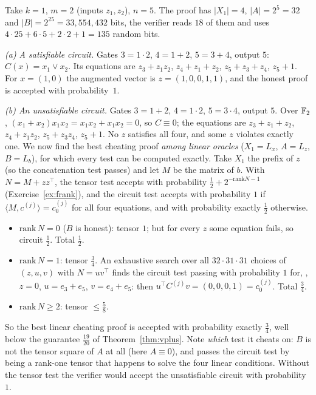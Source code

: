 \begin{example}\label{ex:had}
Take $k=1$, $m=2$ (inputs $z_1,z_2$), $n=5$.  The proof has $|X_1|=4$, $|A|=2^5=32$ and $|B|=2^{25}=33{,}554{,}432$ bits, the verifier reads $18$ of them and uses $4\cdot25+6\cdot5+2\cdot2+1=135$ random bits.

\smallskip\noindent\emph{(a) A satisfiable circuit.}  Gates $3=1\cdot2$, $4=1+2$, $5=3+4$, output $5$: $C(x)=x_1\vee x_2$.  Its equations are $z_3+z_1z_2$, $z_4+z_1+z_2$, $z_5+z_3+z_4$, $z_5+1$.  For $x=(1,0)$ the augmented vector is $z=(1,0,0,1,1)$, and the honest proof is accepted with probability~$1$.

\smallskip\noindent\emph{(b) An unsatisfiable circuit.}  Gates $3=1+2$, $4=1\cdot2$, $5=3\cdot4$, output $5$.  Over $\mathbb{F}_2$, $(x_1+x_2)x_1x_2=x_1x_2+x_1x_2=0$, so $C\equiv0$; the equations are $z_3+z_1+z_2$, $z_4+z_1z_2$, $z_5+z_3z_4$, $z_5+1$.
No $z$ satisfies all four, and some $z$ violates exactly one.  We now find the best cheating proof \emph{among linear oracles} ($X_1=L_x$, $A=L_z$, $B=L_b$), for which every test can be computed exactly.
Take $X_1$ the prefix of $z$ (so the concatenation test passes) and let $M$ be the matrix of $b$.  With $N=M+zz^\top$, the tensor test accepts with probability $\tfrac12+2^{-\mathrm{rank}N-1}$ (Exercise~\ref{ex:frank}), and the circuit test accepts with probability $1$ if
$\langle M,c^{(j)}\rangle=c^{(j)}_0$ for all four equations, and with probability exactly $\tfrac12$ otherwise.
\begin{itemize}
  \item $\mathrm{rank}\,N=0$ ($B$ is honest): tensor $1$; but for every $z$ some equation fails, so circuit $\tfrac12$.  Total $\tfrac12$.
  \item $\mathrm{rank}\,N=1$: tensor $\tfrac34$.  An exhaustive search over all $32\cdot31\cdot31$ choices of $(z,u,v)$ with $N=uv^\top$ finds the circuit test passing with probability $1$ for, \eg, $z=0$, $u=e_3+e_5$, $v=e_4+e_5$: then $u^\top C^{(j)}v=(0,0,0,1)=c^{(j)}_0$.  Total $\tfrac34$.
  \item $\mathrm{rank}\,N\ge2$: tensor $\le\tfrac58$.
\end{itemize}
So the best linear cheating proof is accepted with probability exactly $\tfrac34$, well below the guarantee $\tfrac{19}{20}$ of Theorem~\ref{thm:vplus}.  Note \emph{which} test it cheats on: $B$ is not the tensor square of $A$ at all (here $A\equiv0$), and passes the circuit test by being a rank-one tensor that happens to solve the four linear conditions.  Without the tensor test the verifier would accept the unsatisfiable circuit with probability~$1$.
\end{example}

